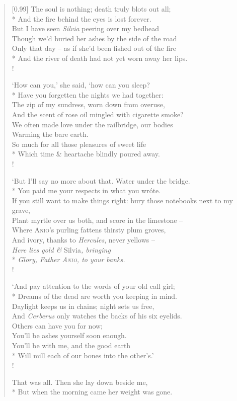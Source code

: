 \begin{verse}[0.99\textwidth]
    The soul is nothing; death truly blots out all;\\*
    \vin And the fire behind the eyes is lost forever.\\
    But I have seen \textit{Silvia} peering over my bedhead\\
    \vin Though we'd buried her ashes by the side of the road\\
    Only that day -- as if she'd been fished out of the fire\\*
    \vin And the river of death had not yet worn away her lips.\\!

    `How can you,' she said, `how can you sleep?\\*
    \vin Have you forgetten the nights we had together:\\
    The zip of my sundress, worn down from overuse,\\
    \vin And the scent of rose oil mingled with cigarette smoke?\\
    We often made love under the railbridge, our bodies\\
    \vin Warming the bare earth.\\
    So much for all those pleasures of sweet life\\*
    \vin Which time \& heartache blindly poured away.\\!

    `But I'll say no more about that. Water under the bridge.\\*
    \vin You paid me your respects in what you wr\'ote.\\
    If you still want to make things right: bury those notebooks next to my grave,\\
    \vin Plant myrtle over us both, and score in the limestone --\\
    Where \textsc{Anio}'s purling fattens thirsty plum groves,\\
    \vin And ivory, thanks to \textit{Hercules}, never yellows --\\
    \textit{Here lies gold \& }Silvia\textit{, bringing}\\*
    \vin \textit{Glory, Father \textsc{Anio}, to your banks.}\\!

    `And pay attention to the words of your old call girl;\\*
    \vin Dreams of the dead are worth you keeping in mind.\\
    Daylight keeps us in chains; night sets us free,\\
    \vin And \textit{Cerberus} only watches the backs of his six eyelids.\\
    Others can have you for now;\\
    \vin You'll be ashes yourself soon enough.\\
    You'll be with me, and the good earth\\*
    \vin Will mill each of our bones into the other's.'\\!

    That was all. Then she lay down beside me,\\*
    \vin But when the morning came her weight was gone.
\end{verse}
